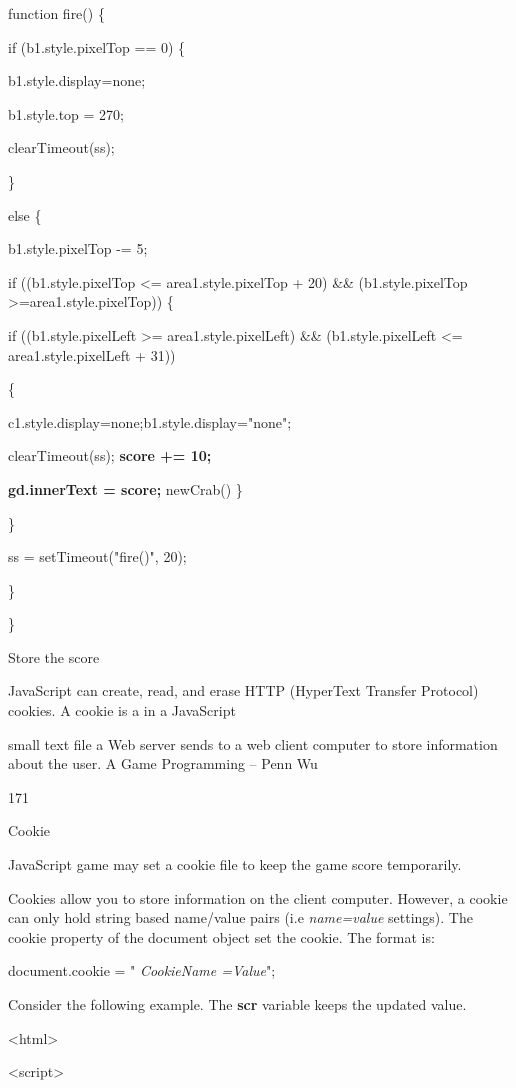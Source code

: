 \documentclass[
]{article}
\begin{document}
function fire() \{

if (b1.style.pixelTop == 0) \{

b1.style.display=\textquotesingle none\textquotesingle;

b1.style.top = 270;

clearTimeout(ss);

\}

else \{

b1.style.pixelTop -= 5;

if ((b1.style.pixelTop \textless= area1.style.pixelTop + 20) \&\&
(b1.style.pixelTop \textgreater=area1.style.pixelTop)) \{

if ((b1.style.pixelLeft \textgreater= area1.style.pixelLeft) \&\&
(b1.style.pixelLeft \textless= area1.style.pixelLeft + 31))

\{

c1.style.display=\textquotesingle none\textquotesingle;b1.style.display="none";

clearTimeout(ss); \textbf{score += 10;}

\textbf{gd.innerText = score;} newCrab() \}

\}

ss = setTimeout("fire()", 20);

\}

\}

Store the score

JavaScript can create, read, and erase HTTP (HyperText Transfer
Protocol) cookies. A cookie is a in a JavaScript

small text file a Web server sends to a web client computer to store
information about the user. A Game Programming -- Penn Wu

171

\protect\hypertarget{index_split_011.htmlux5cux23p172}{}{}Cookie

JavaScript game may set a cookie file to keep the game score
temporarily.

Cookies allow you to store information on the client computer. However,
a cookie can only hold string based name/value pairs (i.e
\emph{name=value} settings). The cookie property of the document object
set the cookie. The format is:

document.cookie = " \emph{CookieName =Value}";

Consider the following example. The \textbf{scr} variable keeps the
updated value.

\textless html\textgreater{}

\textless script\textgreater{}
\end{document}
